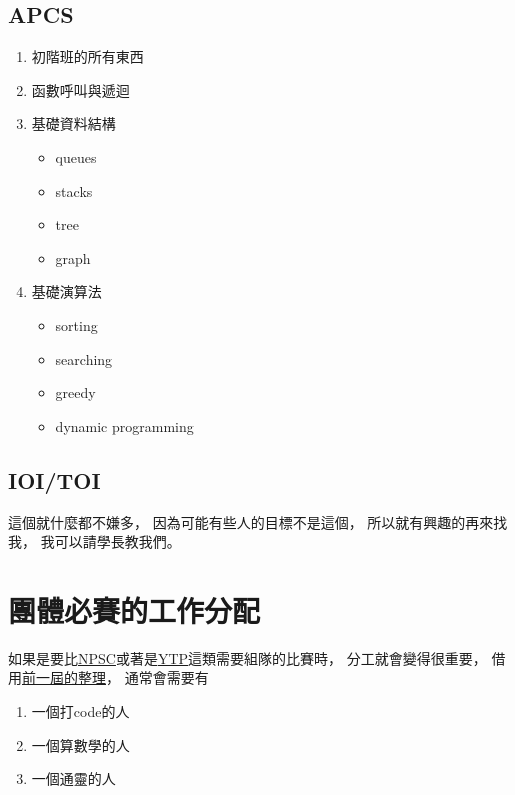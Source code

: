 \documentclass[12pt,oneside]{article}
\begin{document}
\subsection{APCS}
\begin{enumerate}
    \item 初階班的所有東西
    \item 函數呼叫與遞迴
    \item 基礎資料結構
        \begin{itemize}
            \item queues
            \item stacks
            \item tree
            \item graph
        \end{itemize}
    \item 基礎演算法
    \begin{itemize}
        \item sorting
        \item searching
        \item greedy
        \item dynamic programming
    \end{itemize}
\end{enumerate}

\subsection{IOI/TOI}
這個就什麼都不嫌多，
因為可能有些人的目標不是這個，
所以就有興趣的再來找我，
我可以請學長教我們。

\section{團體必賽的工作分配}
如果是要比\href{https://contest.cc.ntu.edu.tw/npsc2021/}{NPSC}或著是\href{https://www.tw-ytp.org/}{YTP}這類需要組隊的比賽時，
分工就會變得很重要，
借用\href{https://hackmd.io/HAShR4J-Q7yhRWboqvLPJA?view}{前一屆的整理}，
通常會需要有\\
\begin{enumerate}
    \item 一個打code的人
    \item 一個算數學的人
    \item 一個通靈的人
\end{enumerate}
\end{document}

